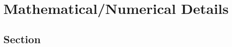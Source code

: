 \chapter{Mathematical/Numerical Details}
\label{chap:Appendix:A}

\section{Section}
\label{sec:Appendix:Section}
